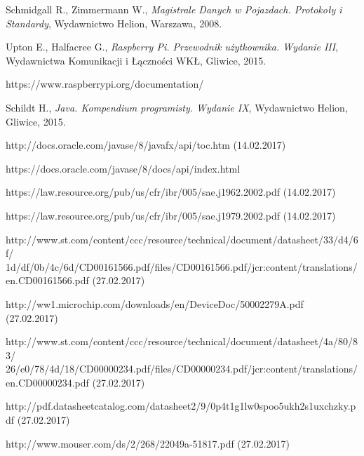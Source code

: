 \documentclass[12pt]{article} %
\numberwithin{equation}{subsection}
\numberwithin{figure}{section}
\numberwithin{table}{section}
\begin{document}
\begin{thebibliography}{99}

		Schmidgall R., Zimmermann W., \emph{Magistrale Danych w Pojazdach. Protokoły i Standardy}, Wydawnictwo Helion, Warszawa, 2008.
		
		Upton E., Halfacree G., \emph{Raspberry Pi. Przewodnik użytkownika. Wydanie III}, Wydawnictwa Komunikacji i Łączności WKŁ, Gliwice, 2015.
		
		https://www.raspberrypi.org/documentation/
	
		Schildt H., \emph{Java. Kompendium programisty. Wydanie IX}, Wydawnictwo Helion, Gliwice, 2015.

		http://docs.oracle.com/javase/8/javafx/api/toc.htm (14.02.2017)
		
		https://docs.oracle.com/javase/8/docs/api/index.html
		
		https://law.resource.org/pub/us/cfr/ibr/005/sae.j1962.2002.pdf (14.02.2017)
		
		https://law.resource.org/pub/us/cfr/ibr/005/sae.j1979.2002.pdf (14.02.2017)
		
		http://www.st.com/content/ccc/resource/technical/document/datasheet/33/d4/6f/
		1d/df/0b/4c/6d/CD00161566.pdf/files/CD00161566.pdf/jcr:content/translations/
		en.CD00161566.pdf (27.02.2017)
		
		http://ww1.microchip.com/downloads/en/DeviceDoc/50002279A.pdf (27.02.2017)
		
		http://www.st.com/content/ccc/resource/technical/document/datasheet/4a/80/83/
		26/e0/78/4d/18/CD00000234.pdf/files/CD00000234.pdf/jcr:content/translations/
		en.CD00000234.pdf (27.02.2017)
		
		http://pdf.datasheetcatalog.com/datasheet2/9/0p4t1g1lw0spoo5ukh2s1uxchzky.pdf (27.02.2017)
		
		http://www.mouser.com/ds/2/268/22049a-51817.pdf (27.02.2017)
		

\end{thebibliography}
	\newpage

	\listoffigures{}
	\newpage

	\listoftables
	\newpage
\end{document}
